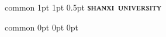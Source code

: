 \documentclass[
    report,     %
    oneside,    %
    UTF8,       %
    zihao=-4    %
]{config} %
\begin{document}






\Header
    {common} %
    {1pt} %
    {1pt} %
    {0.5pt} %
    {} %
    {\includegraphics[width=0.25\textwidth]{figures/logos/SXU-title-EN.png}} %
    {} %


\Footer
    {common} %
    {0pt} %
    {0pt} %
    {0pt} %
    {} %
    {\thepage} %
    {} %





\end{document}
